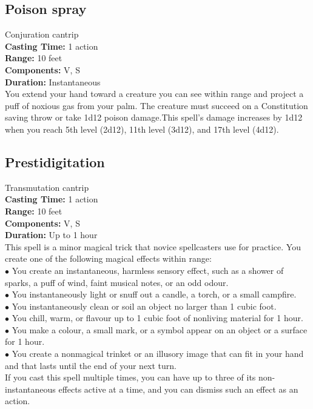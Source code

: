 \documentclass[11pt, A4paper, english]{article}
\begin{document}
		\subsection{Poison spray}
Conjuration cantrip \\
\textbf{Casting Time:} 1 action \\
\textbf{Range:} 10 feet \\
\textbf{Components:} V, S \\
\textbf{Duration:} Instantaneous \\
You extend your hand toward a creature you can see within range and project a puff of noxious gas from your palm. The creature must succeed on a Constitution saving throw or take 1d12 poison damage.This spell's damage increases by 1d12 when you reach 5th level (2d12), 11th level (3d12), and 17th level (4d12).

		\subsection{Prestidigitation}
Transmutation cantrip \\
\textbf{Casting Time:} 1 action \\
\textbf{Range:} 10 feet \\
\textbf{Components:} V, S \\
\textbf{Duration:} Up to 1 hour \\
This spell is a minor magical trick that novice spellcasters use for practice. You create one of the following magical effects within range: \\
\indent $\bullet$ You create an instantaneous, harmless sensory effect, such as a shower of sparks, a puff of wind, faint musical notes, or an odd odour. \\
\indent $\bullet$ You instantaneously light or snuff out a candle, a torch, or a small campfire. \\
\indent $\bullet$ You instantaneously clean or soil an object no larger than 1 cubic foot. \\
\indent $\bullet$ You chill, warm, or flavour up to 1 cubic foot of nonliving material for 1 hour. \\
\indent $\bullet$ You make a colour, a small mark, or a symbol appear on an object or a surface for 1 hour. \\
\indent $\bullet$ You create a nonmagical trinket or an illusory image that can fit in your hand and that lasts until the end of your next turn. \\
If you cast this spell multiple times, you can have up to three of its non-instantaneous effects active at a time, and you can dismiss such an effect as an action.
\end{document}

